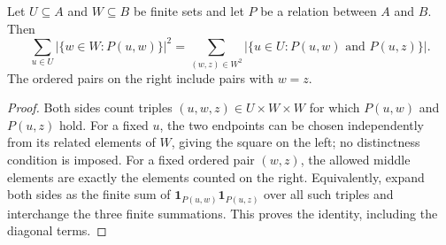 \begin{lemma}
Let $U\subseteq A$ and $W\subseteq B$ be finite sets and let $P$ be a relation
between $A$ and $B$. Then
\[
 \sum_{u\in U}|\{w\in W:P(u,w)\}|^2
 =\sum_{(w,z)\in W^2}|\{u\in U:P(u,w)\text{ and }P(u,z)\}|.
\]
The ordered pairs on the right include pairs with $w=z$.
\end{lemma}
\begin{proof}
Both sides count triples $(u,w,z)\in U\times W\times W$ for which
$P(u,w)$ and $P(u,z)$ hold. For a fixed $u$, the two endpoints can be
chosen independently from its related elements of $W$, giving the square
on the left; no distinctness condition is imposed. For a fixed ordered
pair $(w,z)$, the allowed middle elements are exactly the elements counted
on the right. Equivalently, expand both sides as the finite sum of
$\mathbf1_{P(u,w)}\mathbf1_{P(u,z)}$ over all such triples and interchange
the three finite summations. This proves the identity, including the
diagonal terms.
\end{proof}
